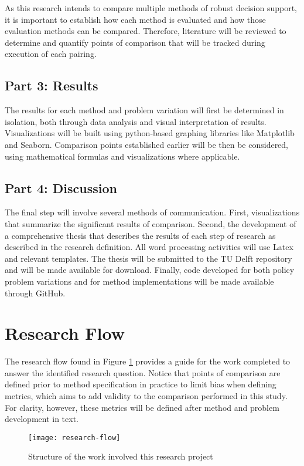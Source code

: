 As this research intends to compare multiple methods of robust decision support, it is important to establish how each method is evaluated and how those evaluation methods can be compared. Therefore, literature will be reviewed to determine and quantify points of comparison that will be tracked during execution of each pairing.

\subsection{Part 3: Results}
The results for each method and problem variation will first be determined in isolation, both through data analysis and visual interpretation of results. Visualizations will be built using python-based graphing libraries like Matplotlib and Seaborn. Comparison points established earlier will be then be considered, using mathematical formulas and visualizations where applicable.

\subsection{Part 4: Discussion}
The final step will involve several methods of communication. First, visualizations that summarize the significant results of comparison. Second, the development of a comprehensive thesis that describes the results of each step of research as described in the research definition. All word processing activities will use Latex and relevant templates. The thesis will be submitted to the TU Delft repository and will be made available for download. Finally, code developed for both policy problem variations and for method implementations will be made available through GitHub.

\section{Research Flow}\label{research flow and scheduled}
The research flow found in Figure \ref{fig:flow} provides a guide for the work completed to answer the identified research question. Notice that points of comparison are defined prior to method specification in practice to limit bias when defining metrics, which aims to add validity to the comparison performed in this study. For clarity, however, these metrics will be defined after method and problem development in text.

\begin{figure}[!h]
    \begin{center}
        \captionsetup{width=0.6\textwidth}
        
        \texttt{[image: research-flow]}
        \caption{Structure of the work involved this research project}
        \label{fig:flow}
    \end{center}
\end{figure}
